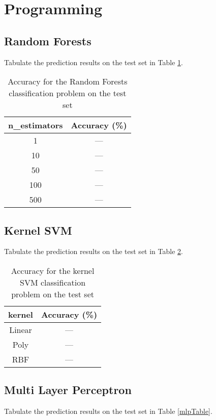 \section{Programming }

\subsection{Random Forests}
    
Tabulate the prediction results on the test set in Table \ref{rfTable}.

\begin{table}[H]
\centering
\begin{tabular}{ |c|c| } 
 \hline
 \textbf{n\_estimators} & \textbf{Accuracy (\%)} \\
 \hline
 1 & --- \\ 
 10 & --- \\
 50 & --- \\ 
 100 & --- \\ 
 500 & --- \\
 \hline
\end{tabular}
\caption{Accuracy for the Random Forests classification problem on the test set}
\label{rfTable}
\end{table}

\subsection{Kernel SVM}

Tabulate the prediction results on the test set in Table \ref{ksvmTable}.
\begin{table}[H]
\centering
\begin{tabular}{ |c|c| } 
 \hline
 \textbf{kernel} & \textbf{Accuracy (\%)} \\
 \hline
 Linear & --- \\ 
 Poly & --- \\
 RBF & --- \\ 
 \hline
\end{tabular}
\caption{Accuracy for the kernel SVM classification problem on the test set}
\label{ksvmTable}
\end{table}

\subsection{Multi Layer Perceptron}

Tabulate the prediction results on the test set in Table \ref{mlpTable}.

